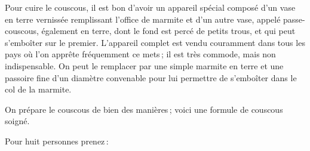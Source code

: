 Pour cuire le couscous, il est bon d'avoir un appareil spécial composé d'un
vase en terre vernissée remplissant l'office de marmite et d'un autre vase, appelé
passe-couscous, également en terre, dont le fond est percé de petits trous, et qui
peut s'emboîter sur le premier. L'appareil complet est vendu couramment dans
tous les pays où l'on apprête fréquemment ce mets ; il est très commode, mais
non indispensable. On peut le remplacer par une simple marmite en terre et une
passoire fine d'un diamètre convenable pour lui permettre de s'emboîter dans le
col de la marmite.

On prépare le couscous de bien des manières ; voici une formule de couscous
soigné.

\medskip

Pour huit personnes prenez :

\medskip

